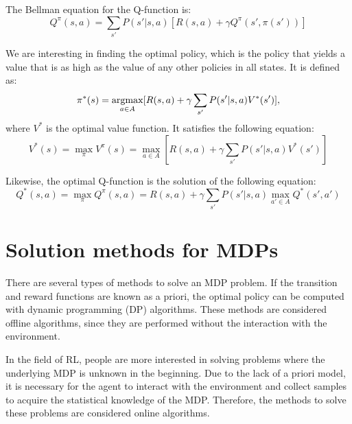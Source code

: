 The Bellman equation for the Q-function is:
\begin{equation}
    Q^{\pi}(s, a) = \sum_{s'}P(s'|s, a)[R(s, a) + \gamma Q^{\pi}(s', \pi(s'))]
    \label{eq:Q}
\end{equation}

We are interesting in finding the optimal policy, which is the policy 
that yields a value that is as high as the value of any other policies in all states.
It is defined as:
\begin{equation}
    \pi^*(s) = \argmax_{a \in A} [R(s, a) + \gamma \sum_{s'} P(s'|s, a)V^*(s')],
\end{equation}
where $V^*$ is the optimal value function. It satisfies the following equation:
\begin{equation}
    V^*(s) = \max_{\pi} V^{\pi} (s) = \max_{a \in A} [R(s, a) + \gamma \sum_{s'} P(s'|s, a)V^*(s')]
\end{equation}

Likewise, the optimal Q-function is the solution of the following equation:
\begin{equation}
    Q^*(s, a) = \max_{\pi} Q^{\pi}(s, a) = R(s, a) + \gamma \sum_{s'} P(s'|s, a) \max_{a' \in A} Q^*(s', a')
    \label{eq:optimalQ}
\end{equation}

\section{Solution methods for MDPs}

There are several types of methods to solve an MDP problem. If the transition and reward functions are known as a priori, 
the optimal policy can be computed with dynamic programming (DP) algorithms.
These methods are considered offline algorithms, since they are performed without
the interaction with the environment.


In the field of RL, people are more interested in solving problems where
the underlying MDP is unknown in the beginning. 
Due to the lack of a priori model, it is necessary for the agent to interact with
the environment and collect samples to acquire the statistical knowledge of the MDP.
Therefore, the methods to solve these
problems are considered online algorithms.

